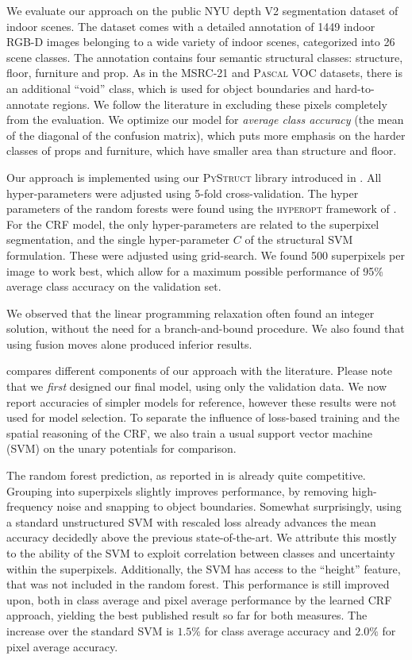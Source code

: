 We evaluate our approach on the public NYU depth V2 segmentation dataset of
indoor scenes.  The dataset comes with a detailed annotation of 1449 indoor
\mbox{RGB-D} images belonging to a wide variety of indoor scenes, categorized into 26
scene classes.  The annotation contains four semantic structural classes:
structure, floor, furniture and prop. As in the MSRC-21 and \textsc{Pascal} VOC
datasets, there is an additional ``void'' class, which is used for object
boundaries and hard-to-annotate regions. We follow the
literature in excluding these pixels completely from the evaluation.
We optimize our model for \emph{average class accuracy} (the mean of the
diagonal of the confusion matrix), which puts more emphasis on the harder
classes of props and furniture, which have smaller area than structure and
floor.

Our approach is implemented using our \textsc{PyStruct}
library introduced in .
%
All hyper-parameters were adjusted using 5-fold cross-validation. The
hyper parameters of the random forests were found using the \textsc{hyperopt}
framework of \citet{bergstra2011algorithms}. For the CRF model, the only
hyper-parameters are related to the superpixel segmentation, and the single
hyper-parameter $C$ of the structural SVM formulation. These were adjusted
using grid-search.
We found 500 superpixels per image to work best, which allow for a maximum
possible performance of 95\% average class accuracy on the validation set.

We observed that the linear programming relaxation
often found an integer solution, without the need for a branch-and-bound procedure. We also found
that using fusion moves alone produced inferior results.

 compares different components of our approach with the literature.
Please note that we \emph{first} designed our final model, using only the
validation data. We now report accuracies of simpler models for reference,
however these results were not used for model selection. To separate
the influence of loss-based training and the spatial reasoning of the CRF,
we also train a usual support vector machine (SVM) on the unary potentials for comparison.

The random forest prediction, as reported in \citet{stueckler2013} is already quite competitive.
Grouping into superpixels slightly improves performance, by removing
high-frequency noise and snapping to object boundaries. Somewhat surprisingly,
using a standard unstructured SVM with rescaled loss already advances the mean
accuracy decidedly above the previous state-of-the-art. We
attribute this mostly to the ability of the SVM to exploit correlation between
classes and uncertainty within the superpixels.
Additionally, the SVM has access to the ``height'' feature, that was not
included in the random forest.
This performance is still improved upon, both in class average and pixel
average performance by the learned CRF approach, yielding
the best published result so far for both measures. The increase over the
standard SVM is $1.5\%$ for class average accuracy and $2.0\%$ for pixel
average accuracy.

